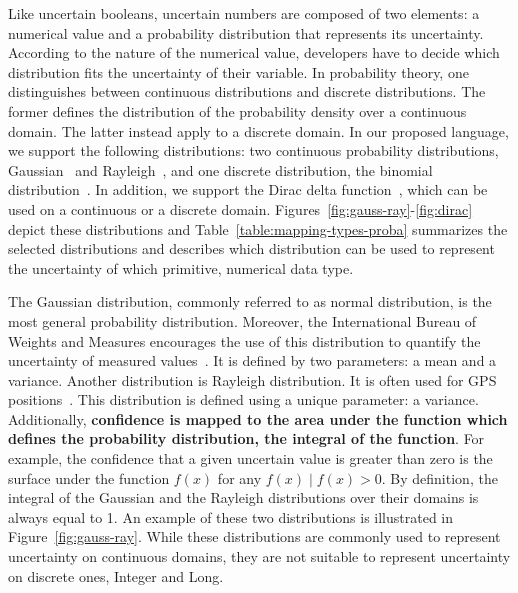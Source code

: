 Like uncertain booleans, uncertain numbers are composed of two elements: a numerical value and a probability distribution that represents its uncertainty.
According to the nature of the numerical value, developers have to decide which distribution fits the uncertainty of their variable. 
In probability theory, one distinguishes between continuous distributions and discrete distributions.
The former defines the distribution of the probability density over a continuous domain.
The latter instead apply to a discrete domain.
In our proposed language, we support the following distributions: two continuous probability distributions, Gaussian~\cite{walck1996hand} and Rayleigh~\cite{walck1996hand}, and one discrete distribution, the binomial distribution~\cite{walck1996hand}.
In addition, we support the Dirac delta function~\cite{gelfand1964}, which can be used on a continuous or a discrete domain.
Figures~\ref{fig:gauss-ray}-\ref{fig:dirac} depict these distributions and Table~\ref{table:mapping-types-proba} summarizes the selected distributions and describes which distribution can be used to represent the uncertainty of which primitive, numerical data type.

The Gaussian distribution, commonly referred to as normal distribution, is the most general probability distribution.
Moreover, the International Bureau of Weights and Measures encourages the use of this distribution to quantify the uncertainty of measured values~\cite{metrology2008evaluation}.
It is defined by two parameters: a mean and a variance.
Another distribution is Rayleigh distribution.
It is often used for GPS positions~\cite{bornholt2013abstractions}.
This distribution is defined using a unique parameter: a variance.
Additionally, \textbf{confidence is mapped  to the area under the function which defines the probability distribution, \ie the integral of the function}.
For example, the confidence that a given uncertain value is greater than zero is the surface under the function $f(x)$ for any $f(x) \mid f(x) > 0$. 
By definition, the integral of the Gaussian and the Rayleigh distributions over their domains is always equal to 1.
An example of these two distributions is illustrated in Figure~\ref{fig:gauss-ray}.
While these distributions are commonly used to represent uncertainty on continuous domains, they are not suitable to represent uncertainty on discrete ones, \eg Integer and Long.

